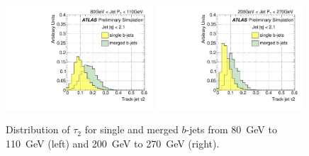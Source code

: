 \begin{figure}[tp]
\centering
\includegraphics[width=0.49\textwidth]{FIGS/VarsSingleMerged/Tau2080.pdf}
\includegraphics[width=0.49\textwidth]{FIGS/VarsSingleMerged/Tau2200.pdf}
\caption{Distribution of $\tau_2$ for single and merged $b$-jets from 80~GeV to 110~GeV (left) and 200~GeV to 270~GeV (right).}
\label{fig:tau2singlemerged}
\end{figure}


